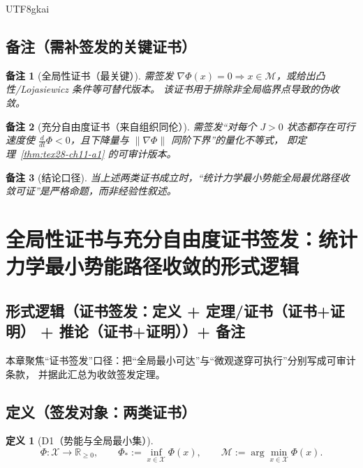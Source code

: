 \documentclass[12pt]{article}
\newtheorem{definition}{定义}[section]
\newtheorem{remark}{备注}[section]
\newcommand{\RR}{\mathbb{R}}
\begin{document}
\begin{CJK*}{UTF8}{gkai}
\subsection{备注（需补签发的关键证书）}
\label{subsec:tex28-ch11-remarks}

\begin{remark}[全局性证书（最关键）]
需签发 $\nabla\Phi(x)=0\Rightarrow x\in\mathcal{M}$，或给出凸性/Lojasiewicz 条件等可替代版本。
该证书用于排除非全局临界点导致的伪收敛。
\end{remark}

\begin{remark}[充分自由度证书（来自组织同伦）]
需签发“对每个 $J>0$ 状态都存在可行速度使 $\frac{d}{dt}\Phi<0$，且下降量与 $\|\nabla\Phi\|$ 同阶下界”的量化不等式，
即定理~\ref{thm:tex28-ch11-a1} 的可审计版本。
\end{remark}

\begin{remark}[结论口径]
当上述两类证书成立时，“统计力学最小势能全局最优路径收敛可证”是严格命题，而非经验性叙述。
\end{remark}

\clearpage

\section{全局性证书与充分自由度证书签发：统计力学最小势能路径收敛的形式逻辑}
\label{sec:tex28-ch12}

\subsection{形式逻辑（证书签发：定义 + 定理/证书（证书+证明） + 推论（证书+证明））+ 备注}
\label{subsec:tex28-ch12-logic-structure}

本章聚焦“证书签发”口径：把“全局最小可达”与“微观遂穿可执行”分别写成可审计条款，
并据此汇总为收敛签发定理。

\subsection{定义（签发对象：两类证书）}
\label{subsec:tex28-ch12-defs}

\begin{definition}[D1（势能与全局最小集）]
\label{def:tex28-ch12-d1}
\[
  \Phi:\mathcal{X}\to\RR_{\ge 0},
  \qquad
  \Phi_*:=\inf_{x\in\mathcal{X}}\Phi(x),
  \qquad
  \mathcal{M}:=\arg\min_{x\in\mathcal{X}}\Phi(x).
\]
\end{definition}


\end{CJK*}
\end{document}
